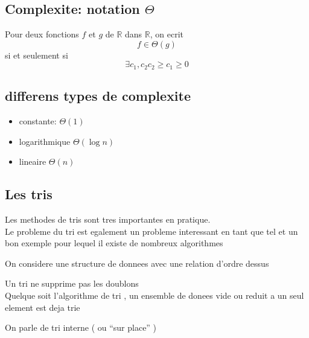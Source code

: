 \documentclass[../main.tex]{subfiles}
\begin{document}
\subsection{Complexite: notation $\Theta$}
\begin{defn}
Pour deux fonctions $f$ et $g$ de $\mathbb{R}$ dans $\mathbb{R}$, on ecrit
\[ 
	f \in \Theta(g)
\]
si et seulement si 
\[ 
\exists c_1, c_2  c_2\geq c_1\geq 0
\]

\end{defn}

\subsection{ differens types de complexite }

\begin{itemize}
	\item constante: $\Theta (1)$ 
	\item logarithmique $\Theta(\log n)$ 
	\item lineaire $\Theta(n)$
\end{itemize}

\subsection{Les tris}
Les methodes de tris sont tres importantes en pratique.\\
Le probleme du tri est egalement un probleme interessant en tant que tel et un bon exemple pour lequel il existe de nombreux algorithmes

On considere une structure de donnees avec une relation d'ordre dessus
\begin{rmq}
Un tri ne supprime pas les doublons\\
Quelque soit l'algorithme de tri , un ensemble de donees vide ou reduit a un seul element est deja trie
\end{rmq}
On parle de tri interne ( ou ``sur place'' )
\end{document}
